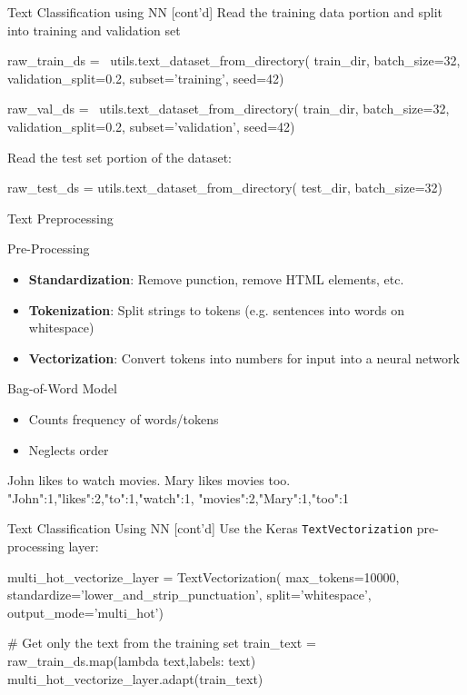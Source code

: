 \documentclass[ignorenonframetext,xcolor=x11names]{beamer}
\begin{document}
\begin{frame}[label=withcode,fragile]{Text Classification using NN \small [cont'd]}
Read the training data portion and split into training and validation set
\begin{pythoncode}
raw_train_ds = \
utils.text_dataset_from_directory(
    train_dir, batch_size=32,
    validation_split=0.2,
    subset='training', seed=42)
    
raw_val_ds = \
utils.text_dataset_from_directory(
    train_dir, batch_size=32,
    validation_split=0.2,
    subset='validation', seed=42)
\end{pythoncode}
Read the test set portion of the dataset:
\begin{pythoncode}
raw_test_ds = utils.text_dataset_from_directory(
    test_dir, batch_size=32)
\end{pythoncode}
\end{frame}

\begin{frame}[label=full,fragile]{Text Preprocessing}
\begin{block}{Pre-Processing}
\begin{itemize}
   \item \textbf{Standardization}: Remove punction, remove HTML elements, etc.
   \item \textbf{Tokenization}: Split strings to tokens (e.g. sentences into words on whitespace)
   \item \textbf{Vectorization}: Convert tokens into numbers for input into a neural network
\end{itemize}
\end{block}
\begin{block}{Bag-of-Word Model}
\begin{itemize}
   \item Counts frequency of words/tokens
   \item Neglects order
\end{itemize}
\begin{textcode}
John likes to watch movies. Mary likes movies too.
{"John":1,"likes":2,"to":1,"watch":1,
 "movies":2,"Mary":1,"too":1}
\end{textcode}
\end{block}
\end{frame}


\begin{frame}[label=withcode,fragile]{Text Classification Using NN \small [cont'd]}
Use the Keras \texttt{TextVectorization} pre-processing layer:
\begin{pythoncode}
multi_hot_vectorize_layer = TextVectorization(
    max_tokens=10000,
    standardize='lower_and_strip_punctuation',
    split='whitespace',
    output_mode='multi_hot')
    
# Get only the text from the training set
train_text = raw_train_ds.map(lambda text,labels: text)
multi_hot_vectorize_layer.adapt(train_text)
\end{pythoncode}
\end{frame}
\end{document}
